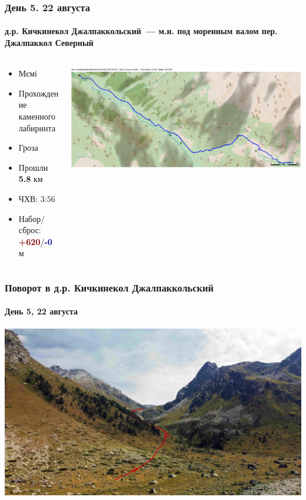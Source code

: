 	\begin{frame}
	\frametitle{День 5. 22 августа}
	\framesubtitle{д.р. Кичкинекол Джалпаккольский~--- м.н. под моренным валом пер. Джалпаккол Северный} %
	\begin{columns}[c] %
		\begin{column}{0.45\textwidth} %
			\begin{itemize}
				\item Мємі
				\item Прохождение каменного лабиринта
				\item Гроза
				\item Прошли \textbf{5.8} км
				\item ЧХВ: 3:56
				\item Набор/сброс: \textcolor{darkred}{\textbf{+620}}/\textcolor{darkblue}{\textbf{-0}}~м
			\end{itemize}
			
		\end{column}
		\begin{column}{0.5\textwidth} %
			\centering
			\includegraphics[width=\linewidth]{../pics/mini_maps/22}
		\end{column}
	\end{columns}
\end{frame}

\begin{frame}
	\frametitle{Поворот в д.р. Кичкинекол Джалпаккольский}
	\framesubtitle{День 5, 22 августа}
	\centering
	\includegraphics[width=\textwidth]{../pics/DJI_0835}			
\end{frame}



